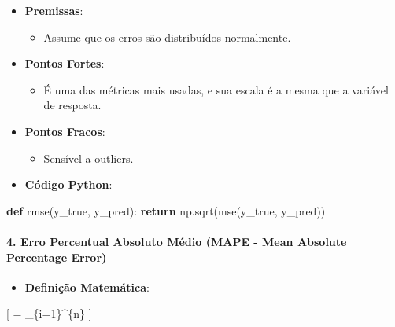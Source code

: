 \documentclass[11pt]{article}
\providecommand{\tightlist}{%
      \setlength{\itemsep}{0pt}\setlength{\parskip}{0pt}}
\newenvironment{Shaded}{}{}
\newcommand{\KeywordTok}[1]{\textcolor[rgb]{0.00,0.44,0.13}{\textbf{{#1}}}}
\newcommand{\NormalTok}[1]{{#1}}
\newcommand{\ControlFlowTok}[1]{\textcolor[rgb]{0.00,0.44,0.13}{\textbf{{#1}}}}
\begin{document}
\begin{itemize}
\tightlist
\item
  \textbf{Premissas}:

  \begin{itemize}
  \tightlist
  \item
    Assume que os erros são distribuídos normalmente.
  \end{itemize}
\item
  \textbf{Pontos Fortes}:

  \begin{itemize}
  \tightlist
  \item
    É uma das métricas mais usadas, e sua escala é a mesma que a
    variável de resposta.
  \end{itemize}
\item
  \textbf{Pontos Fracos}:

  \begin{itemize}
  \tightlist
  \item
    Sensível a outliers.
  \end{itemize}
\item
  \textbf{Código Python}:
\end{itemize}

\begin{Shaded}
\begin{Highlighting}[]
\KeywordTok{def}\NormalTok{ rmse(y\_true, y\_pred):}
    \ControlFlowTok{return}\NormalTok{ np.sqrt(mse(y\_true, y\_pred))}
\end{Highlighting}
\end{Shaded}

\hypertarget{erro-percentual-absoluto-muxe9dio-mape---mean-absolute-percentage-error}{%
\paragraph{4. Erro Percentual Absoluto Médio (MAPE - Mean Absolute
Percentage
Error)}\label{erro-percentual-absoluto-muxe9dio-mape---mean-absolute-percentage-error}}

\begin{itemize}
\tightlist
\item
  \textbf{Definição Matemática}:
\end{itemize}

{[}  =  \sum\_\{i=1\}\^{}\{n\}
\left\textbar{}\right\textbar{} {]}
\end{document}
